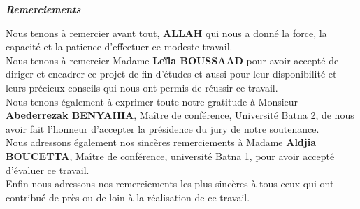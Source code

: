 \newpage
\thispagestyle{empty}
\begin{center}
\textcolor[rgb]{0,0,1}{{\Huge\textbf{\textit{Remerciements}}}}
\end{center}

\vspace{1 cm}


Nous tenons à remercier avant tout, \textbf{ALLAH} qui nous a donné la force, la capacité et la patience d'effectuer ce  modeste travail.\\

Nous tenons à remercier Madame \textbf{Leïla BOUSSAAD} pour avoir accepté de diriger et encadrer ce projet de fin d'études et aussi pour leur disponibilité et leurs précieux conseils qui nous ont permis de réussir ce travail.\\

Nous tenons également à exprimer toute notre gratitude à Monsieur \textbf{ Abederrezak BENYAHIA},  Maître de conférence, Université Batna 2, de nous avoir fait l'honneur d'accepter la présidence du jury de notre soutenance.\\

Nous adressons également nos sincères remerciements à Madame  \textbf{Aldjia BOUCETTA}, Maître de conférence, université Batna 1, pour avoir accepté d'évaluer ce travail.\\

Enfin nous adressons nos remerciements les plus sincères à tous ceux qui ont contribué de près ou de loin à la réalisation de ce travail.\\


